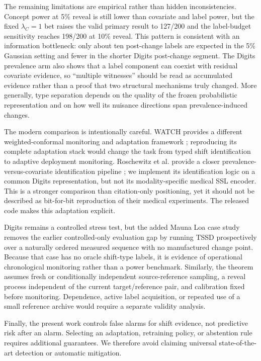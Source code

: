 \documentclass[11pt,a4paper]{article}
\theoremstyle{definition}
\newcommand{\1}{\mathbf{1}}
\begin{document}
The remaining limitations are empirical rather than hidden inconsistencies. Concept power at 5\% reveal is still lower than covariate and label power, but the fixed $\lambda_C=1$ bet raises the valid primary result to 127/200 and the label-budget sensitivity reaches 198/200 at 10\% reveal. This pattern is consistent with an information bottleneck: only about ten post-change labels are expected in the 5\% Gaussian setting and fewer in the shorter Digits post-change segment. The Digits prevalence arm also shows that a label component can coexist with residual covariate evidence, so ``multiple witnesses'' should be read as accumulated evidence rather than a proof that two structural mechanisms truly changed. More generally, type separation depends on the quality of the frozen probabilistic representation and on how well its nuisance directions span prevalence-induced changes.

The modern comparison is intentionally careful. WATCH provides a different weighted-conformal monitoring and adaptation framework \citep{prinster2025watch}; reproducing its complete adaptation stack would change the task from typed shift identification to adaptive deployment monitoring. Roschewitz et al. provide a closer prevalence-versus-covariate identification pipeline \citep{roschewitz2025}; we implement its identification logic on a common Digits representation, but not its modality-specific medical SSL encoder. This is a stronger comparison than citation-only positioning, yet it should not be described as bit-for-bit reproduction of their medical experiments. The released code makes this adaptation explicit.

Digits remains a controlled stress test, but the added Mauna Loa case study removes the earlier controlled-only evaluation gap by running TSSD prospectively over a naturally ordered measured sequence with no manufactured change point. Because that case has no oracle shift-type labels, it is evidence of operational chronological monitoring rather than a power benchmark. Similarly, the theorem assumes fresh or conditionally independent source-reference sampling, a reveal process independent of the current target/reference pair, and calibration fixed before monitoring. Dependence, active label acquisition, or repeated use of a small reference archive would require a separate validity analysis.

Finally, the present work controls false alarms for shift evidence, not predictive risk after an alarm. Selecting an adaptation, retraining policy, or abstention rule requires additional guarantees. We therefore avoid claiming universal state-of-the-art detection or automatic mitigation.
\end{document}
